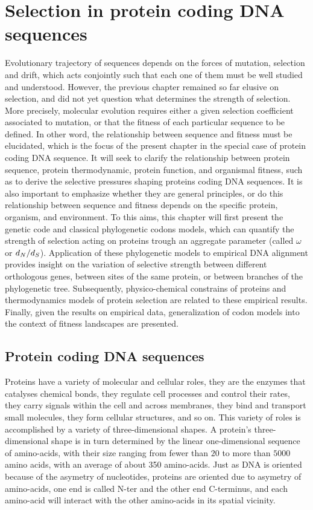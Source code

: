 \chapter{Selection in protein coding {DNA} sequences}
{
	\hypersetup{linkcolor=GREYDARK}
	\minitoc
}
\label{sec:selection}
Evolutionary trajectory of sequences depends on the forces of mutation, selection and drift, which acts conjointly such that each one of them must be well studied and understood.
However, the previous chapter remained so far elusive on selection, and did not yet question what determines the strength of selection.
More precisely, molecular evolution requires either a given selection coefficient associated to mutation, or that the fitness of each particular sequence to be defined.
In other word, the relationship between sequence and fitness must be elucidated, which is the focus of the present chapter in the special case of protein coding \acrshort{DNA} sequence.
It will seek to clarify the relationship between protein sequence, protein thermodynamic, protein function, and organismal fitness, such as to derive the selective pressures shaping proteins coding \acrshort{DNA} sequences.
It is also important to emphasize whether they are general principles, or do this relationship between sequence and fitness depends on the specific protein, organism, and environment.
To this aims, this chapter will first present the genetic code and classical phylogenetic \glspl{codon} models, which can quantify the strength of selection acting on proteins trough an aggregate parameter (called $\omega$ or $d_N / d_S$).
Application of these phylogenetic models to empirical \acrshort{DNA} alignment provides insight on the variation of selective strength between different orthologous genes, between sites of the same protein, or between branches of the phylogenetic tree.
Subsequently, physico-chemical constrains of proteins and thermodynamics models of protein selection are related to these empirical results.
Finally, given the results on empirical data, generalization of \gls{codon} models into the context of fitness landscapes are presented.

\section{Protein coding {DNA} sequences}

Proteins have a variety of molecular and cellular roles, they are the enzymes that catalyses chemical bonds, they regulate cell processes and control their rates, they carry signals within the cell and across membranes, they bind and transport small molecules, they form cellular structures, and so on.
This variety of roles is accomplished by a variety of three-dimensional shapes.
A protein's three-dimensional shape is in turn determined by the linear one-dimensional sequence of amino-acids, with their size ranging from fewer than $20$ to more than $5000$ amino acids, with an average of about 350 amino-acids.
Just as \acrshort{DNA} is oriented because of the asymetry of nucleotides, proteins are oriented due to asymetry of amino-acids, one end is called \gls{N-ter} and the other end C-terminus, and each amino-acid will interact with the other amino-acids in its spatial vicinity. 

